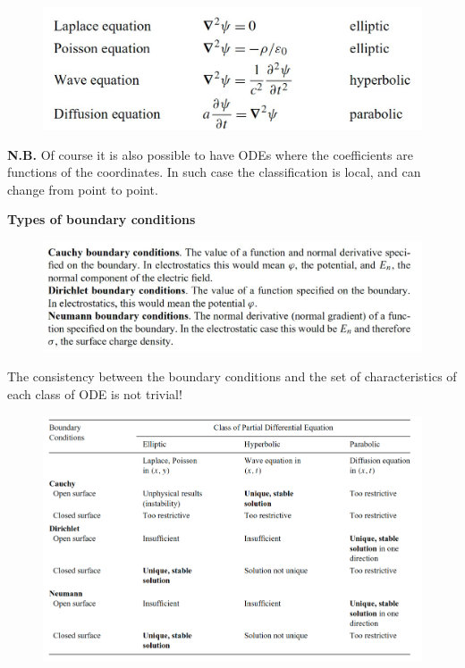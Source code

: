 \documentclass{article}
\begin{document}
\begin{figure}[h]
    \centering
    \includegraphics[width=0.6\linewidth]{fig57.png}
\end{figure}

\noindent
\textbf{N.B.} Of course it is also possible to have ODEs where the coefficients are functions of the coordinates. In such case the classification is local, and can change from point to point.

\vspace{3mm}\noindent
\textbf{Types of boundary conditions}

\begin{figure}[h]
    \centering
    \includegraphics[width=0.85\linewidth]{fig58.png}
\end{figure}

\noindent
The consistency between the boundary conditions and the set of characteristics of each class of ODE is not trivial!

\newpage

\begin{figure}[h]
    \centering
    \includegraphics[width=0.9\linewidth]{fig59.png}
\end{figure}
\end{document}

